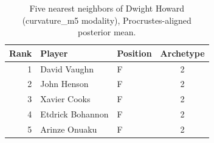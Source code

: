 \begin{table}[htbp]
  \centering\small
  \begin{tabular}{rllc}
    \toprule
    Rank & Player & Position & Archetype \\
    \midrule
    1 & David Vaughn & F & 2 \\
    2 & John Henson & F & 2 \\
    3 & Xavier Cooks & F & 2 \\
    4 & Etdrick Bohannon & F & 2 \\
    5 & Arinze Onuaku & F & 2 \\
    \bottomrule
  \end{tabular}
  \caption{Five nearest neighbors of Dwight Howard (curvature_m5 modality), Procrustes-aligned posterior mean.}
  \label{tab:Dwight_Howard_neighbors_curvature_m5}
\end{table}


